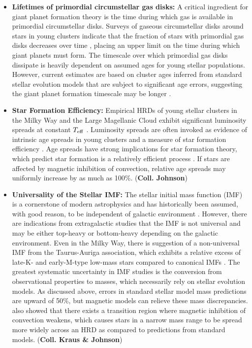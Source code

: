 \begin{itemize}
	\item {\bf Lifetimes of primordial circumstellar gas disks:} A critical ingredient for giant planet formation theory is the time during which gas is available in primordial circumstellar disks. Surveys of gaseous circumstellar disks around stars in young clusters indicate that the fraction of stars with primordial gas disks decreases over time \citep{Haisch2001, Mamajek2009}, placing an upper limit on the time during which giant planets must form. The timescale over which primordial gas disks dissipate is heavily dependent on assumed ages for young stellar populations. However, current estimates are based on cluster ages inferred from standard stellar evolution models that are subject to significant age errors, suggesting the giant planet formation timescale may be longer \citep[e.g.,][]{Bell2013}. \\
	
	\item {\bf Star Formation Efficiency:} Empirical HRDs of young stellar clusters in the Milky Way and the Large Magellanic Cloud exhibit significant luminosity spreads at constant $T_{\rm eff}$ \citep[e.g.,][]{Hillenbrand1997, DaRio2010b, DaRio2010a}. Luminosity spreads are often invoked as evidence of intrinsic age spreads in young clusters and a measure of star formation efficiency \citep[e.g.,][]{Kenyon1995, Hillenbrand1997}. Age spreads have strong implications for star formation theory, which predict star formation is a relatively efficient process \citep{Elmegreen2000}. If stars are affected by magnetic inhibition of convection, relative age spreads may uniformly increase by as much as 100\%. ({\bf Coll. Johnson}) \\
	
	\item {\bf Universality of the Stellar IMF:} The stellar initial mass function (IMF) is a cornerstone of modern astrophysics and has historically been assumed, with good reason, to be independent of galactic environment \citep{Bastian2010}. However, there are indications from extragalactic studies that the IMF is not universal and may be either top-heavy \citep[e.g.,][]{Dave2008, Weidner2011} or bottom-heavy \citep[e.g.,][]{vanDokkum2011, Conroy2012} depending on the galactic environment. Even in the Milky Way, there is suggestion of a non-universal IMF from the Taurus-Auriga association, which exhibits a relative excess of late-K- and early-M-type low-mass stars compared to canonical IMFs \citep{Luhman2009}. The greatest systematic uncertainty in IMF studies is the conversion from observational properties to masses, which necessarily rely on stellar evolution models. As discussed above, errors in standard stellar model mass predictions are upward of 50\%, but magnetic models can relieve these mass discrepancies. \citet{Feiden2016} also showed that there exists a transition region where magnetic inhibition of convection weakens, which causes stars in a narrow mass range to be spread more widely across an HRD as compared to predictions from standard models. ({\bf Coll. Kraus \& Johnson}) \\

\end{itemize}


